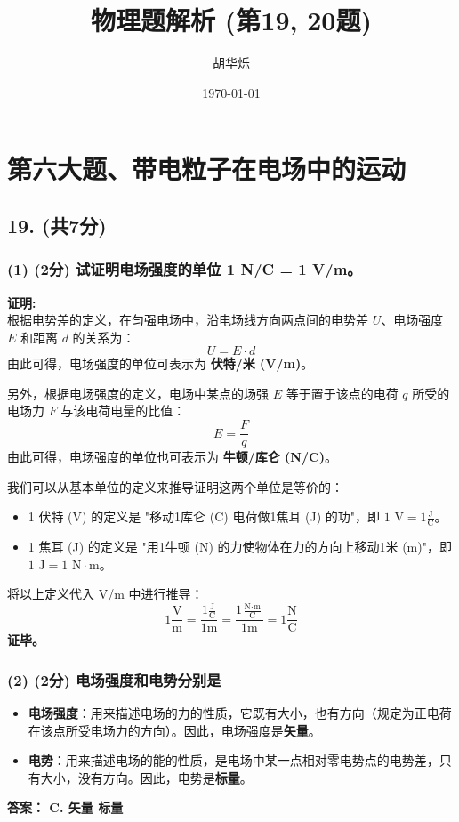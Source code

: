 \documentclass[12pt]{article}
\title{物理题解析 (第19, 20题)}
\author{胡华烁}
\date{\today}
\begin{document}
\maketitle
\tableofcontents
\newpage

\section*{第六大题、带电粒子在电场中的运动}

\subsection*{19. (共7分)}

\subsubsection*{(1) (2分) 试证明电场强度的单位 1 N/C = 1 V/m。}
\textbf{证明:} \\
根据电势差的定义，在匀强电场中，沿电场线方向两点间的电势差 $U$、电场强度 $E$ 和距离 $d$ 的关系为：
\[ U = E \cdot d \]
由此可得，电场强度的单位可表示为 \textbf{伏特/米 (V/m)}。

\vspace{1em}
另外，根据电场强度的定义，电场中某点的场强 $E$ 等于置于该点的电荷 $q$ 所受的电场力 $F$ 与该电荷电量的比值：
\[ E = \frac{F}{q} \]
由此可得，电场强度的单位也可表示为 \textbf{牛顿/库仑 (N/C)}。

\vspace{1em}
我们可以从基本单位的定义来推导证明这两个单位是等价的：
\begin{itemize}
    \item 1 伏特 (V) 的定义是 "移动1库仑 (C) 电荷做1焦耳 (J) 的功"，即 $1 \text{ V} = 1 \frac{\text{J}}{\text{C}}$。
    \item 1 焦耳 (J) 的定义是 "用1牛顿 (N) 的力使物体在力的方向上移动1米 (m)"，即 $1 \text{ J} = 1 \text{ N} \cdot \text{m}$。
\end{itemize}
将以上定义代入 V/m 中进行推导：
\[ 1 \frac{\text{V}}{\text{m}} = \frac{1 \frac{\text{J}}{\text{C}}}{1 \text{m}} = \frac{1 \frac{\text{N} \cdot \text{m}}{\text{C}}}{1 \text{m}} = 1 \frac{\text{N}}{\text{C}} \]
\hfill \textbf{证毕。}

\subsubsection*{(2) (2分) 电场强度和电势分别是}
\begin{itemize}
    \item \textbf{电场强度}：用来描述电场的力的性质，它既有大小，也有方向（规定为正电荷在该点所受电场力的方向）。因此，电场强度是\textbf{矢量}。
    \item \textbf{电势}：用来描述电场的能的性质，是电场中某一点相对零电势点的电势差，只有大小，没有方向。因此，电势是\textbf{标量}。
\end{itemize}
\textbf{答案： C. 矢量 标量}
\end{document}
